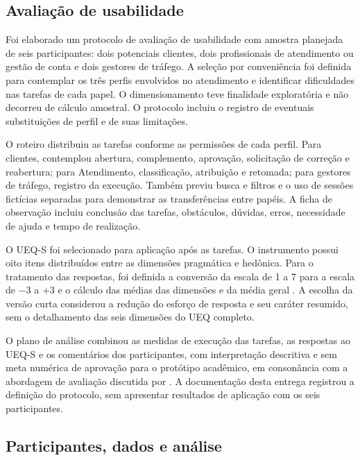 \subsection{\esp Avaliação de usabilidade}

Foi elaborado um protocolo de avaliação de usabilidade com amostra planejada de seis participantes: dois potenciais clientes, dois profissionais de atendimento ou gestão de conta e dois gestores de tráfego. A seleção por conveniência foi definida para contemplar os três perfis envolvidos no atendimento e identificar dificuldades nas tarefas de cada papel. O dimensionamento teve finalidade exploratória e não decorreu de cálculo amostral. O protocolo incluiu o registro de eventuais substituições de perfil e de suas limitações.

O roteiro distribuiu as tarefas conforme as permissões de cada perfil. Para clientes, contemplou abertura, complemento, aprovação, solicitação de correção e reabertura; para Atendimento, classificação, atribuição e retomada; para gestores de tráfego, registro da execução. Também previu busca e filtros e o uso de sessões fictícias separadas para demonstrar as transferências entre papéis. A ficha de observação incluiu conclusão das tarefas, obstáculos, dúvidas, erros, necessidade de ajuda e tempo de realização.

O UEQ-S foi selecionado para aplicação após as tarefas. O instrumento possui oito itens distribuídos entre as dimensões pragmática e hedônica. Para o tratamento das respostas, foi definida a conversão da escala de 1 a 7 para a escala de $-3$ a $+3$ e o cálculo das médias das dimensões e da média geral \cite{schrepp2017}. A escolha da versão curta considerou a redução do esforço de resposta e seu caráter resumido, sem o detalhamento das seis dimensões do UEQ completo.

O plano de análise combinou as medidas de execução das tarefas, as respostas ao UEQ-S e os comentários dos participantes, com interpretação descritiva e sem meta numérica de aprovação para o protótipo acadêmico, em consonância com a abordagem de avaliação discutida por . A documentação desta entrega registrou a definição do protocolo, sem apresentar resultados de aplicação com os seis participantes.

\subsection{\esp Participantes, dados e análise}


